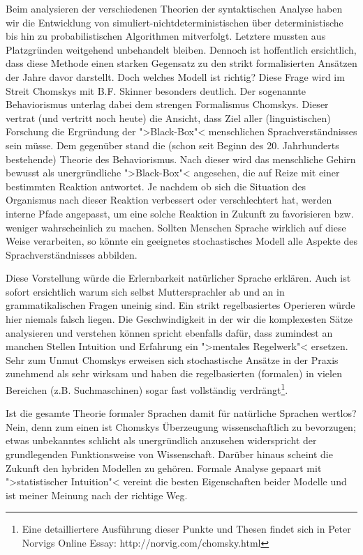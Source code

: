 \documentclass[12pt,a4paper]{article}
\theoremstyle{definition}
\begin{document}
	Beim analysieren der verschiedenen Theorien der syntaktischen Analyse haben wir die Entwicklung von simuliert-nichtdeterministischen
	über deterministische bis hin zu probabilistischen Algorithmen mitverfolgt. Letztere mussten aus Platzgründen weitgehend unbehandelt bleiben.
	Dennoch ist hoffentlich ersichtlich, dass diese Methode einen starken Gegensatz zu den strikt formalisierten Ansätzen der Jahre davor
	darstellt. Doch welches Modell ist richtig? Diese Frage wird im Streit Chomskys mit B.F. Skinner besonders deutlich.
	Der sogenannte Behaviorismus unterlag dabei dem strengen Formalismus Chomskys. Dieser vertrat (und vertritt noch heute) die Ansicht,
	dass Ziel aller (linguistischen) Forschung die Ergründung der ">Black-Box"< menschlichen Sprachverständnisses sein müsse. Dem gegenüber stand
	die (schon seit Beginn des 20. Jahrhunderts bestehende) Theorie des Behaviorismus. Nach dieser wird das menschliche Gehirn bewusst
	als unergründliche ">Black-Box"< angesehen, die auf Reize mit einer bestimmten Reaktion antwortet. Je nachdem ob sich die Situation des
	Organismus nach dieser Reaktion verbessert oder verschlechtert hat, werden interne Pfade angepasst, um eine solche Reaktion in Zukunft
	zu favorisieren bzw. weniger wahrscheinlich zu machen. Sollten Menschen Sprache wirklich auf diese Weise verarbeiten, so könnte ein geeignetes
	stochastisches Modell alle Aspekte des Sprachverständnisses abbilden.
	
	Diese Vorstellung würde die Erlernbarkeit natürlicher Sprache erklären. Auch ist sofort ersichtlich warum sich selbst Muttersprachler
	ab und an in grammatikalischen Fragen uneinig sind. Ein strikt regelbasiertes Operieren würde hier niemals falsch liegen. Die Geschwindigkeit
	in der wir die komplexesten Sätze analysieren und verstehen können spricht ebenfalls dafür, dass zumindest an manchen Stellen Intuition und Erfahrung
	ein ">mentales Regelwerk"< ersetzen. Sehr zum Unmut Chomskys erweisen sich stochastische Ansätze in der Praxis zunehmend als sehr wirksam und haben die regelbasierten (formalen) in vielen Bereichen (z.B. Suchmaschinen) sogar fast vollständig verdrängt\footnote{Eine detailliertere Ausführung dieser Punkte und Thesen findet sich in Peter Norvigs Online Essay: http://norvig.com/chomsky.html}.
	
	Ist die gesamte Theorie formaler Sprachen damit für natürliche Sprachen wertlos? Nein, denn zum einen ist Chomskys Überzeugung wissenschaftlich zu bevorzugen; etwas unbekanntes schlicht als unergründlich anzusehen widerspricht der grundlegenden Funktionsweise von Wissenschaft. Darüber hinaus scheint die Zukunft den hybriden Modellen zu gehören. Formale Analyse gepaart mit ">statistischer Intuition"< vereint die besten Eigenschaften beider Modelle und ist meiner Meinung nach der richtige Weg.
\end{document}
